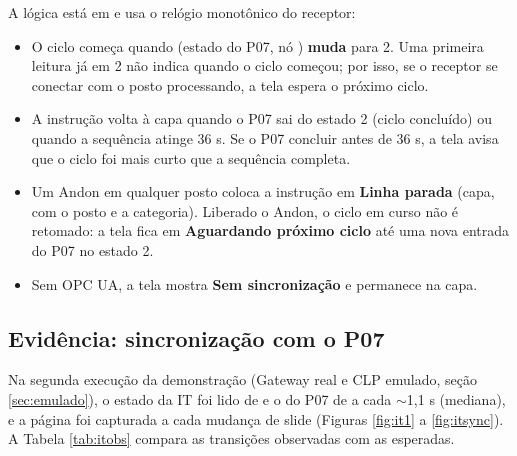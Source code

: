 A lógica está em  e usa o relógio monotônico do receptor:

\begin{itemize}
    \item O ciclo começa quando  (estado do P07, nó ) \textbf{muda} para 2. Uma primeira leitura já em 2 não indica quando o ciclo começou; por isso, se o receptor se conectar com o posto processando, a tela espera o próximo ciclo.
    \item A instrução volta à capa quando o P07 sai do estado 2 (ciclo concluído) ou quando a sequência atinge 36 s. Se o P07 concluir antes de 36 s, a tela avisa que o ciclo foi mais curto que a sequência completa.
    \item Um Andon em qualquer posto coloca a instrução em \textbf{Linha parada} (capa, com o posto e a categoria). Liberado o Andon, o ciclo em curso não é retomado: a tela fica em \textbf{Aguardando próximo ciclo} até uma nova entrada do P07 no estado 2.
    \item Sem OPC UA, a tela mostra \textbf{Sem sincronização} e permanece na capa.
\end{itemize}

\subsection{Evidência: sincronização com o P07}

Na segunda execução da demonstração (Gateway real e CLP emulado, seção \ref{sec:emulado}), o estado da IT foi lido de  e o do P07 de  a cada $\sim$1,1 s (mediana), e a página foi capturada a cada mudança de slide (Figuras \ref{fig:it1} a \ref{fig:itsync}). A Tabela \ref{tab:itobs} compara as transições observadas com as esperadas.

